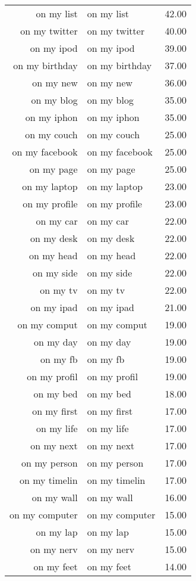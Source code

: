 \begin{table}[ht]
\begin{tabular}{rlr}
  on my list & on my list & 42.00 \\ 
  on my twitter & on my twitter & 40.00 \\ 
  on my ipod & on my ipod & 39.00 \\ 
  on my birthday & on my birthday & 37.00 \\ 
  on my new & on my new & 36.00 \\ 
  on my blog & on my blog & 35.00 \\ 
  on my iphon & on my iphon & 35.00 \\ 
  on my couch & on my couch & 25.00 \\ 
  on my facebook & on my facebook & 25.00 \\ 
  on my page & on my page & 25.00 \\ 
  on my laptop & on my laptop & 23.00 \\ 
  on my profile & on my profile & 23.00 \\ 
  on my car & on my car & 22.00 \\ 
  on my desk & on my desk & 22.00 \\ 
  on my head & on my head & 22.00 \\ 
  on my side & on my side & 22.00 \\ 
  on my tv & on my tv & 22.00 \\ 
  on my ipad & on my ipad & 21.00 \\ 
  on my comput & on my comput & 19.00 \\ 
  on my day & on my day & 19.00 \\ 
  on my fb & on my fb & 19.00 \\ 
  on my profil & on my profil & 19.00 \\ 
  on my bed & on my bed & 18.00 \\ 
  on my first & on my first & 17.00 \\ 
  on my life & on my life & 17.00 \\ 
  on my next & on my next & 17.00 \\ 
  on my person & on my person & 17.00 \\ 
  on my timelin & on my timelin & 17.00 \\ 
  on my wall & on my wall & 16.00 \\ 
  on my computer & on my computer & 15.00 \\ 
  on my lap & on my lap & 15.00 \\ 
  on my nerv & on my nerv & 15.00 \\ 
  on my feet & on my feet & 14.00 \\ 

\end{tabular}
\end{table}
